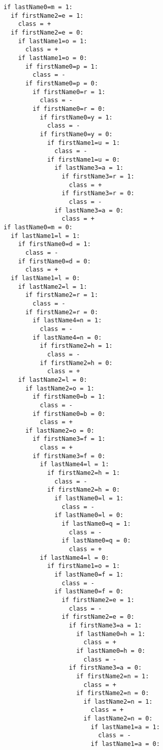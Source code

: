 \begin{verbatim}
if lastName0=m = 1:
  if firstName2=e = 1: 
    class = +
  if firstName2=e = 0:
    if lastName1=o = 1: 
      class = +
    if lastName1=o = 0:
      if firstName0=p = 1: 
        class = -
      if firstName0=p = 0:
        if firstName0=r = 1: 
          class = -
        if firstName0=r = 0:
          if firstName0=y = 1: 
            class = -
          if firstName0=y = 0:
            if firstName1=u = 1: 
              class = -
            if firstName1=u = 0:
              if lastName3=a = 1:
                if firstName3=r = 1: 
                  class = +
                if firstName3=r = 0: 
                  class = -
              if lastName3=a = 0: 
                class = +
if lastName0=m = 0:
  if lastName1=l = 1:
    if firstName0=d = 1: 
      class = -
    if firstName0=d = 0: 
      class = +
  if lastName1=l = 0:
    if lastName2=l = 1:
      if firstName2=r = 1: 
        class = -
      if firstName2=r = 0:
        if lastName4=n = 1: 
          class = -
        if lastName4=n = 0:
          if firstName2=h = 1: 
            class = -
          if firstName2=h = 0: 
            class = +
    if lastName2=l = 0:
      if lastName2=o = 1:
        if firstName0=b = 1: 
          class = -
        if firstName0=b = 0: 
          class = +
      if lastName2=o = 0:
        if firstName3=f = 1: 
          class = +
        if firstName3=f = 0:
          if lastName4=l = 1:
            if firstName2=h = 1: 
              class = -
            if firstName2=h = 0:
              if lastName0=l = 1: 
                class = -
              if lastName0=l = 0:
                if lastName0=q = 1: 
                  class = -
                if lastName0=q = 0: 
                  class = +
          if lastName4=l = 0:
            if firstName1=o = 1:
              if lastName0=f = 1: 
                class = -
              if lastName0=f = 0:
                if firstName2=e = 1: 
                  class = -
                if firstName2=e = 0:
                  if firstName3=a = 1:
                    if lastName0=h = 1: 
                      class = +
                    if lastName0=h = 0: 
                      class = -
                  if firstName3=a = 0:
                    if firstName2=n = 1: 
                      class = +
                    if firstName2=n = 0:
                      if lastName2=n = 1: 
                        class = +
                      if lastName2=n = 0:
                        if lastName1=a = 1: 
                          class = -
                        if lastName1=a = 0:

\end{verbatim}
